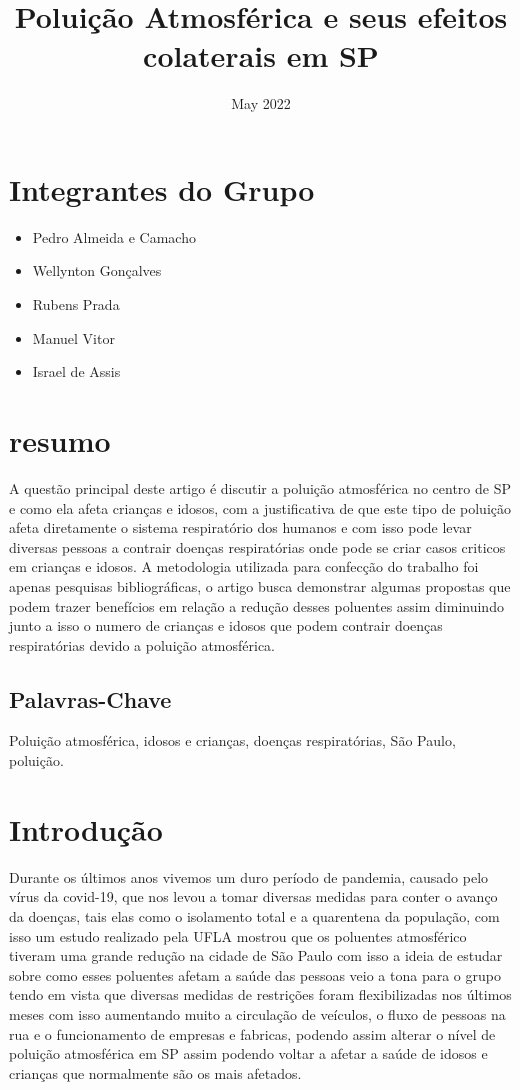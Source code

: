 \documentclass[
	article,			%
	11pt,				%
	oneside,			%
	a4paper,			%
	english,			%
	brazil,				%
	sumario=tradicional
	]{abntex2}
\title{Poluição Atmosférica e seus efeitos colaterais em SP}
\date{May 2022}
\begin{document}
\maketitle

\section*{Integrantes do Grupo}
\begin{itemize}
    \item Pedro Almeida e Camacho
    \item Wellynton Gonçalves
    \item Rubens Prada 
    \item Manuel Vitor
    \item Israel de Assis
\end{itemize}


\section{resumo}
A questão principal deste artigo é discutir a poluição atmosférica no centro de SP e como ela afeta crianças e idosos, com a justificativa de que este tipo de poluição afeta diretamente o sistema respiratório dos humanos e com isso pode levar diversas pessoas a contrair doenças respiratórias onde pode se criar casos criticos em crianças e idosos. A metodologia utilizada para confecção do trabalho foi apenas pesquisas bibliográficas, o artigo busca demonstrar algumas propostas que podem trazer benefícios em relação a redução desses poluentes assim diminuindo junto a isso o numero de crianças e idosos que podem contrair doenças respiratórias devido a poluição atmosférica.
\subsection{Palavras-Chave}
Poluição atmosférica, idosos e crianças, doenças respiratórias, São Paulo, poluição.



\section{Introdução}
Durante os últimos anos vivemos um duro período de pandemia, causado pelo vírus da covid-19, que nos levou a tomar diversas medidas para conter o avanço da doenças, tais elas como o isolamento total e a quarentena da população, com isso um estudo realizado pela UFLA mostrou que os poluentes atmosférico tiveram uma grande redução na cidade de São Paulo  com isso a ideia de estudar sobre como esses poluentes afetam a saúde das pessoas veio a tona para o grupo tendo em vista que diversas medidas de restrições foram flexibilizadas nos últimos meses com isso aumentando muito a circulação de veículos, o fluxo de pessoas na rua e o funcionamento de empresas e fabricas, podendo assim alterar o nível de poluição atmosférica em SP assim podendo voltar a afetar a saúde de idosos e crianças que normalmente são os mais afetados.
\end{document}
